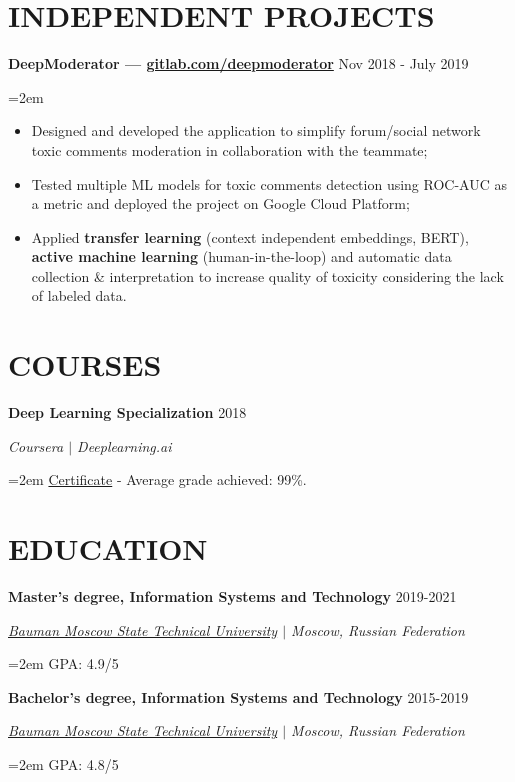 \documentclass{article}
\newcommand{\NewPart}[1]{\section*{{\color{gray}\uppercase{#1}}}}
\newcommand{\ExperienceEntry}[4]{
		\noindent \textbf{#1} \hfill  
		\hfill #2 \par  %
		\noindent \textit{#3} \par        %
		\noindent\hangindent=2em\hangafter=0 \small #4 %
		\normalsize \par}
\begin{document}
\NewPart{Independent Projects}{}
\ExperienceEntry
{DeepModerator  --- {\href{https://gitlab.com/deepmoderator} {gitlab.com/deepmoderator}}}
{Nov 2018 - July 2019}
{}
{\begin{itemize}
	\item{Designed and developed the application to simplify forum/social network toxic comments moderation in collaboration with the teammate;}
	\item{Tested multiple ML models for toxic comments detection using ROC-AUC as a metric and deployed the project on Google Cloud Platform;}
	\item{Applied \textbf{transfer learning} (context independent embeddings, BERT), \textbf{active machine learning} (human-in-the-loop) and automatic data collection \& interpretation to increase quality of toxicity considering the lack of labeled data.}
\end{itemize}
}

\NewPart{Courses}{}
\ExperienceEntry
{Deep Learning Specialization}
{2018}
{Coursera $\vert$ Deeplearning.ai}
{\href{https://www.coursera.org/account/accomplishments/specialization/V5P6NWX4CR95} {Certificate} - Average grade achieved: 99\%.}

\NewPart{Education}{}
\ExperienceEntry
{Master's degree, Information Systems and Technology}
{2019-2021}
{\href{http://bmstu.ru/en}{Bauman Moscow State Technical University} $\vert$ Moscow, Russian Federation}
{GPA: 4.9/5}
\ExperienceEntry
{Bachelor's degree, Information Systems and Technology}
{2015-2019}
{\href{http://bmstu.ru/en}{Bauman Moscow State Technical University} $\vert$ Moscow, Russian Federation}
{GPA: 4.8/5}
\end{document}
